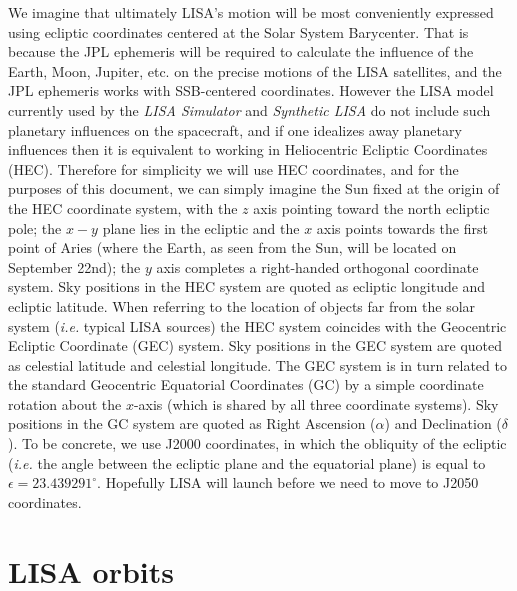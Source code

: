 \documentclass[11pt]{report}
\begin{document}
We imagine that ultimately LISA's motion will be most conveniently expressed using ecliptic coordinates centered at the Solar System Barycenter.
That is because the JPL ephemeris will be required to calculate the influence of the Earth, Moon, Jupiter, etc. on the precise motions of
the LISA satellites, and the JPL ephemeris works with SSB-centered coordinates.  However the LISA model currently used by the {\it LISA Simulator} and
{\it Synthetic LISA} do not include such planetary influences on the spacecraft, and if one idealizes away planetary influences then it is equivalent
to working in Heliocentric Ecliptic Coordinates (HEC). Therefore for simplicity we will use HEC coordinates, and for the purposes of this document, we can 
simply imagine the Sun fixed at the origin of the HEC coordinate system, with the $z$ axis pointing toward the north ecliptic pole; the $x-y$ plane lies in the ecliptic and the $x$ axis points towards the first point of Aries (where the Earth, as seen from the Sun, will be located on September 22nd); the $y$ axis completes a right-handed orthogonal coordinate system. Sky positions in the HEC system are quoted as
ecliptic longitude and ecliptic latitude. When referring to the location of objects far from
the solar system ({\it i.e.} typical LISA sources) the HEC system coincides with the
Geocentric Ecliptic Coordinate (GEC) system. Sky positions in the GEC system are quoted as
celestial latitude and celestial longitude. The GEC system is in turn related to the standard Geocentric
Equatorial Coordinates (GC) by a simple coordinate rotation about the $x$-axis (which is shared by all
three coordinate systems). Sky positions in the GC system are quoted as Right Ascension ($\alpha$)
and Declination ($\delta$). To be concrete, we use J2000 coordinates, in which the obliquity of
the ecliptic ({\it i.e.} the angle between the ecliptic plane and the equatorial plane) is
equal to $\epsilon = 23.439291^\circ$. Hopefully LISA will launch before we need to move to
J2050 coordinates. 


\section{LISA orbits}
\label{sec:orbits}
\end{document}
